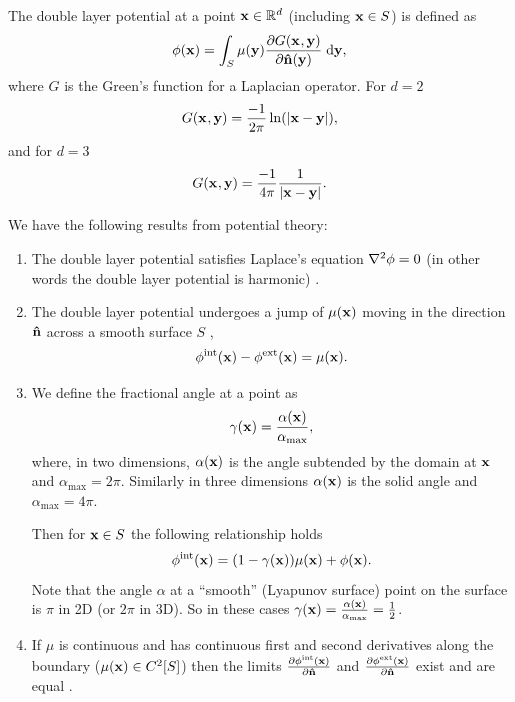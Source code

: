 The double layer potential at a point $\mathbf{x} \in \mathbb{R}^d$ (including $\mathbf{x} \in S$) is defined as \cite{eom_double_layer_potential}
\begin{equation}
  \label{eq:3}
  \phi(\mathbf{x}) = \int_{S} \mu(\mathbf{y}) \frac{\partial G(\mathbf{x}_{},\mathbf{y})}{\partial \mathbf{\hat{n}}(\mathbf{y})} {\; \mathrm{{d}}} \mathbf{y},
\end{equation}
where $G$ is the Green's function for a Laplacian operator.
For $d=2$
\[ G(\mathbf{x}_{},\mathbf{y}) = \dfrac{-1}{2\pi}\ln(\left|{\mathbf{x} - \mathbf{y}} \right|), \]
and for $d=3$
\begin{equation} G(\mathbf{x}_{},\mathbf{y}) = \dfrac{-1}{4 \pi} \dfrac{1}{\left|{\mathbf{x} - \mathbf{y}} \right|}.
  \label{eqn:greenslaplacian3d}
\end{equation}


We have the following results from potential theory:
\begin{enumerate}
\item The double layer potential satisfies Laplace's equation $\nabla^2 \phi = 0$ (in other words the double layer potential is harmonic) \cite{Sternberg1946}.

\item The double layer potential undergoes a jump of $\mu(\mathbf{x})$ moving in the direction $\mathbf{\hat{n}}$ across a smooth surface $S$ \cite[136-140]{Sternberg1946}, \ie
  \begin{equation}
    \label{eq:15}
    \phi^{\mathrm{int}}(\mathbf{x}) - \phi^{\mathrm{ext}}(\mathbf{x}) = \mu(\mathbf{x}).
  \end{equation}

\item We define the fractional angle at a point as
  \begin{equation}
    \gamma(\mathbf{x}) = \frac{\alpha(\mathbf{x})}{\alpha_{\text{max}}},
  \end{equation}
  where, in two dimensions, $\alpha(\mathbf{x})$ is the angle subtended by the domain at $\mathbf{x}$ and $\alpha_{\text{max}} = 2\pi$.
  Similarly in three dimensions $\alpha(\mathbf{x})$ is the solid angle and $\alpha_{\text{max}} = 4\pi$.

  Then for $\mathbf{x} \in S$ the following relationship holds \cite[137-139, 155]{Sternberg1946}
  \begin{equation}
    \phi^{\mathrm{int}}(\mathbf{x}) = (1 - \gamma(\mathbf{x})) \mu(\mathbf{x}) + \phi(\mathbf{x}).
    \label{eq:22}
  \end{equation}
  Note that the angle $\alpha$ at a ``smooth'' (\ie Lyapunov surface) point on the surface is $\pi$ in 2D (or $2\pi$ in 3D).
  So in these cases $\gamma(\mathbf{x}) = \frac{\alpha(\mathbf{x})}{\alpha_{\text{max}}} = \frac{1}{2}$.

\item If $\mu$ is continuous and has continuous first and second derivatives along the boundary (\ie $\mu(\mathbf{x}) \in C^2[S]$) then the limits $\frac{\partial \phi^{\mathrm{int}}(\mathbf{x})}{\partial \mathbf{\hat{n}}}$ and $\frac{\partial \phi^{\mathrm{ext}}(\mathbf{x})}{\partial \mathbf{\hat{n}}}$ exist and are equal \cite[145-153]{Sternberg1946}.

\end{enumerate}


